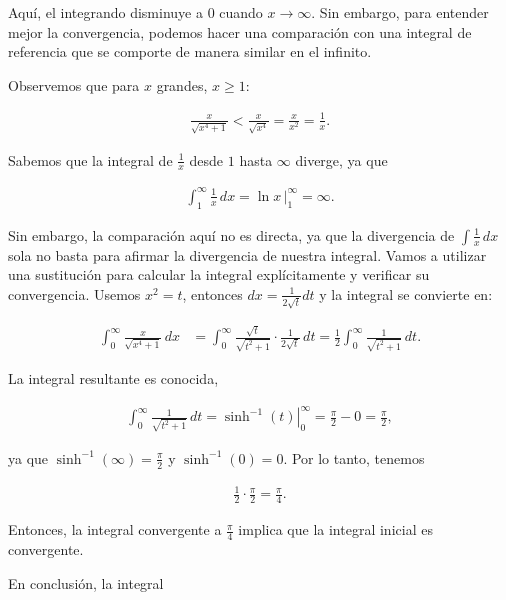 \documentclass{article}
\begin{document}
    Aquí, el integrando disminuye a $0$ cuando $x \to \infty$. Sin embargo, para entender mejor la convergencia, podemos hacer una comparación con una integral de referencia que se comporte de manera similar en el infinito.

    Observemos que para $x$ grandes, $x \geq 1$:

    \begin{align*}
    \frac{x}{\sqrt{x^4 + 1}} < \frac{x}{\sqrt{x^4}} = \frac{x}{x^2} = \frac{1}{x}.
    \end{align*}

    Sabemos que la integral de $\frac{1}{x}$ desde $1$ hasta $\infty$ diverge, ya que

    \begin{align*}
    \int_1^\infty \frac{1}{x} \, dx = \left. \ln x \, \right|_1^\infty = \infty.
    \end{align*}

    Sin embargo, la comparación aquí no es directa, ya que la divergencia de $\int \frac{1}{x} \, dx$ sola no basta para afirmar la divergencia de nuestra integral. Vamos a utilizar una sustitución para calcular la integral explícitamente y verificar su convergencia. Usemos $x^2 = t$, entonces $dx = \frac{1}{2\sqrt{t}} dt$ y la integral se convierte en:

    \begin{align*}
    \int_{0}^{\infty} \frac{x}{\sqrt{x^{4}+1}} \, dx
    &= \int_{0}^{\infty} \frac{\sqrt{t}}{\sqrt{t^2+1}} \cdot \frac{1}{2\sqrt{t}} \, dt
    = \frac{1}{2} \int_{0}^{\infty} \frac{1}{\sqrt{t^2+1}} \, dt.
    \end{align*}

    La integral resultante es conocida,

    \begin{align*}
    \int_{0}^{\infty} \frac{1}{\sqrt{t^2 + 1}} \, dt = \left. \sinh^{-1}(t) \right|_{0}^{\infty} = \frac{\pi}{2} - 0 = \frac{\pi}{2},
    \end{align*}

    ya que $\sinh^{-1}(\infty) = \frac{\pi}{2}$ y $\sinh^{-1}(0) = 0$. Por lo tanto, tenemos

    \begin{align*}
    \frac{1}{2} \cdot \frac{\pi}{2} = \frac{\pi}{4}.
    \end{align*}

    Entonces, la integral convergente a $\frac{\pi}{4}$ implica que la integral inicial es convergente.

    En conclusión, la integral
\end{document}
